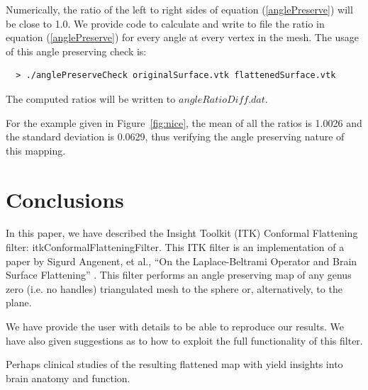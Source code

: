\documentclass{InsightArticle}
\begin{document}
  Numerically, the ratio of the left to right sides of equation
  (\ref{anglePreserve}) will be close to 1.0. We provide code to
  calculate and write to file the ratio in equation
  (\ref{anglePreserve}) for every angle at every vertex in the
  mesh. The usage of this angle preserving check is:
  \begin{verbatim}
  > ./anglePreserveCheck originalSurface.vtk flattenedSurface.vtk
  \end{verbatim}
  \noindent The computed ratios will be written to
  $angleRatioDiff.dat$. 

  For the example given in Figure~\ref{fig:nice}, the mean of all the
  ratios is 1.0026 and the standard deviation is 0.0629, thus
  verifying the angle preserving nature of this mapping.
  
	\section{Conclusions}
	In this paper, we have described the Insight Toolkit (ITK) Conformal
	Flattening filter: itkConformalFlatteningFilter. This ITK filter is
	an implementation of a paper by Sigurd Angenent, et al., ``On the
	Laplace-Beltrami Operator and Brain Surface Flattening''
	\cite{angenent1999lbo}. This filter performs an angle preserving map
	of any genus zero (i.e. no handles) triangulated mesh to the sphere
	or, alternatively, to the plane.

	We have provide the user with details to be able to reproduce our
	results. We have also given suggestions as to how to exploit the
	full functionality of this filter.

	Perhaps clinical studies of the resulting flattened map with yield
	insights into brain anatomy and function.






\end{document}

